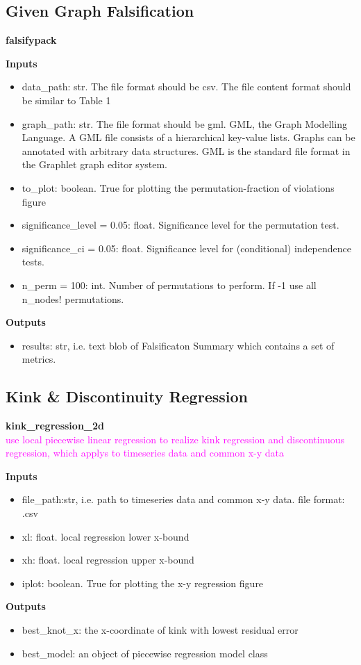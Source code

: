 \subsection{Given Graph Falsification}
\textbf{falsifypack}
\par\textbf{Inputs}
\begin{itemize}
    \item data\_path: str. The file format should be csv. The file content format should be similar to Table 1 
    \item graph\_path: str. The file format should be gml. GML, the Graph Modelling Language. A GML file consists of a hierarchical key-value lists. Graphs can be annotated with arbitrary data structures. GML is the standard file format in the Graphlet graph editor system. 
    \item to\_plot: boolean. True for plotting the permutation\mbox{-}fraction of violations figure
    \item significance\_level = 0.05: float. Significance level for the permutation test.
    \item significance\_ci = 0.05: float. Significance level for (conditional) independence tests.
    \item n\_perm = 100: int. Number of permutations to perform. If -1 use all n\_nodes! permutations.
\end{itemize}
\par\textbf{Outputs}
\begin{itemize}
    \item results: str, i.e. text blob of Falsificaton Summary which contains a set of metrics.
\end{itemize}

\subsection{Kink \& Discontinuity Regression}
\textbf{kink\_regression\_2d}\\
\textcolor{magenta}{use local piecewise linear regression to realize kink regression and discontinuous regression, which applys to timeseries data and common x-y data}
\par\textbf{Inputs}
\begin{itemize}
    \item file\_path:str, i.e. path to timeseries data and common x-y data. file format: .csv
    \item xl: float. local regression lower x\mbox{-}bound 
    \item xh: float. local regression upper x\mbox{-}bound
    \item iplot: boolean. True for plotting the x-y regression figure 
\end{itemize}
\par\textbf{Outputs}
\begin{itemize}
    \item best\_knot\_x: the x-coordinate of kink with lowest residual error
    \item best\_model: an object of piecewise regression model class
\end{itemize}

